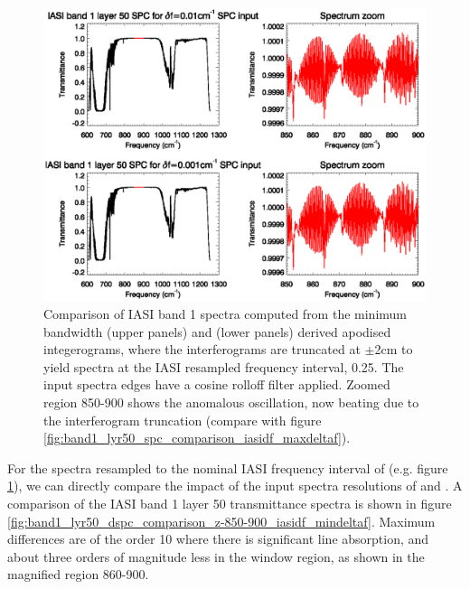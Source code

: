 \begin{figure}[htp]
  \centering
  \includegraphics[scale=0.8]{graphics/band1_lyr50_spc_comparison_iasidf_mindeltaf.eps}
  \caption{Comparison of IASI band 1 spectra computed from the minimum bandwidth  (upper panels) and  (lower panels) derived apodised integerograms, where the interferograms are truncated at $\pm$2cm to yield spectra at the IASI resampled frequency interval, 0.25\invcm. The input spectra edges have a cosine rolloff filter applied. Zoomed region 850-900{\invcm} shows the anomalous oscillation, now beating due to the interferogram truncation (compare with figure \ref{fig:band1_lyr50_spc_comparison_iasidf_maxdeltaf}).}
  \label{fig:band1_lyr50_spc_comparison_iasidf_mindeltaf}
\end{figure}

For the spectra resampled to the nominal IASI frequency interval of \invcm (e.g. figure \ref{fig:band1_lyr50_spc_comparison_iasidf_mindeltaf}), we can directly compare the impact of the input spectra resolutions of \invcm{} and \invcm. A comparison of the IASI band 1 layer 50 transmittance spectra is shown in figure \ref{fig:band1_lyr50_dspc_comparison_z-850-900_iasidf_mindeltaf}. Maximum differences are of the order 10 where there is significant line absorption, and about three orders of magnitude less in the window region, as shown in the magnified region 860-900\invcm.

